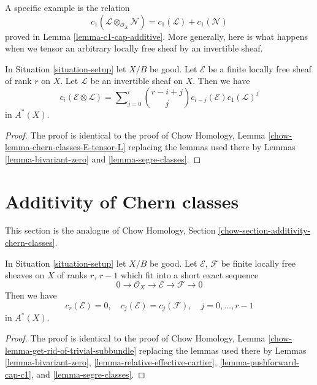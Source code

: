 \medskip\noindent
A specific example is the relation
$$
c_1(\mathcal{L} \otimes_{\mathcal{O}_X} \mathcal{N})
=
c_1(\mathcal{L}) + c_1(\mathcal{N})
$$
proved in Lemma \ref{lemma-c1-cap-additive}.
More generally, here is what happens when we tensor an
arbitrary locally free sheaf by an invertible sheaf.

\begin{lemma}
\label{lemma-chern-classes-E-tensor-L}
In Situation \ref{situation-setup} let $X/B$ be good.
Let $\mathcal{E}$ be a finite locally free sheaf of
rank $r$ on $X$. Let $\mathcal{L}$ be an invertible
sheaf on $X$. Then we have
\begin{equation}
\label{equation-twist}
c_i({\mathcal E} \otimes {\mathcal L})
=
\sum\nolimits_{j = 0}^i
\binom{r - i + j}{j} c_{i - j}({\mathcal E}) c_1({\mathcal L})^j
\end{equation}
in $A^*(X)$.
\end{lemma}

\begin{proof}
The proof is identical to the proof of
Chow Homology, Lemma \ref{chow-lemma-chern-classes-E-tensor-L}
replacing the lemmas used there by Lemmas \ref{lemma-bivariant-zero} and
\ref{lemma-segre-classes}.
\end{proof}












\section{Additivity of Chern classes}
\label{section-additivity-chern-classes}

\noindent
This section is the analogue of Chow Homology, Section
\ref{chow-section-additivity-chern-classes}.

\begin{lemma}
\label{lemma-get-rid-of-trivial-subbundle}
In Situation \ref{situation-setup} let $X/B$ be good.
Let $\mathcal{E}$, $\mathcal{F}$ be finite locally free sheaves
on $X$ of ranks $r$, $r - 1$ which fit into a short
exact sequence
$$
0 \to \mathcal{O}_X \to \mathcal{E} \to \mathcal{F} \to 0
$$
Then we have
$$
c_r(\mathcal{E}) = 0, \quad
c_j(\mathcal{E}) = c_j(\mathcal{F}), \quad j = 0, \ldots, r - 1
$$
in $A^*(X)$.
\end{lemma}

\begin{proof}
The proof is identical to the proof of
Chow Homology, Lemma \ref{chow-lemma-get-rid-of-trivial-subbundle}
replacing the lemmas used there by
Lemmas \ref{lemma-bivariant-zero},
\ref{lemma-relative-effective-cartier},
\ref{lemma-pushforward-cap-c1}, and
\ref{lemma-segre-classes}.
\end{proof}

